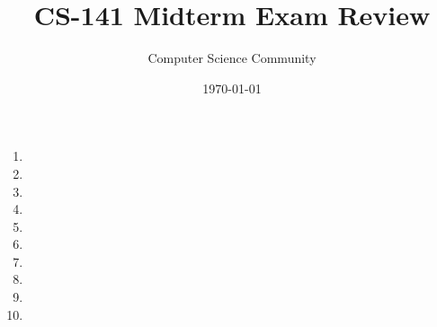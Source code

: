 \documentclass[11pt]{article}
\title{CS-141 Midterm Exam Review}
\author{Computer Science Community}
\date{\today}
\begin{document}
\header

\begin{enumerate}
	\item 
	
    \item 

    \item 

 	\item 
 	
 \pagebreak
     \item 
 \vfill
 
 \pagebreak
     \item 
     
     \item 

\pagebreak
	\item 
	
\newpage
	\item 

	\item 
	
	
	
	
	
	
	
	
	
	
%
%
%
%
%    


\end{enumerate}
\end{document}
